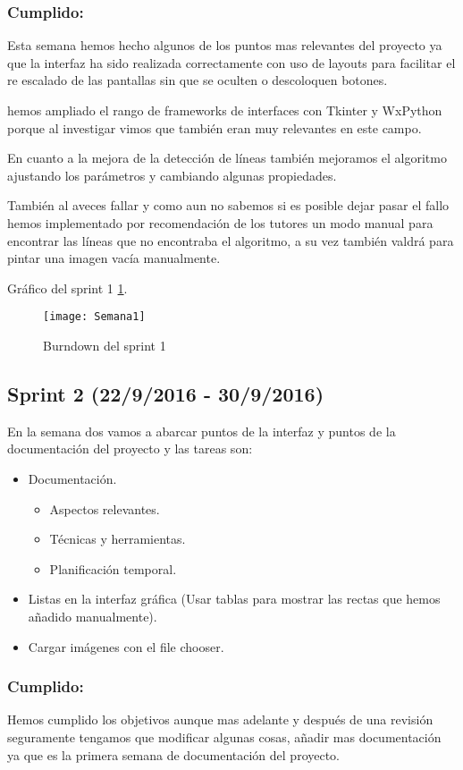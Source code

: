 \subsubsection{Cumplido:}
Esta semana hemos hecho algunos de los puntos mas relevantes del proyecto ya que la interfaz ha sido realizada correctamente con uso de layouts para facilitar el re escalado de las pantallas sin que se oculten o descoloquen botones.

hemos ampliado el rango de frameworks de interfaces con Tkinter y WxPython porque al investigar vimos que también eran muy relevantes en este campo.

En cuanto a la mejora de la detección de líneas también mejoramos el algoritmo ajustando los parámetros y cambiando algunas propiedades.

También al aveces fallar y como aun no sabemos si es posible dejar pasar el fallo hemos implementado por recomendación de los tutores un modo manual para encontrar las líneas que no encontraba el algoritmo, a su vez también valdrá para pintar una imagen vacía manualmente.

Gráfico del sprint 1 \ref{fig:A.2.1}.
\begin{figure}[h]
\centering
\texttt{[image: Semana1]}
\caption{Burndown del sprint 1}
\label{fig:A.2.1}
\end{figure}

\subsection{Sprint 2 (22/9/2016 - 30/9/2016)}
En la semana dos vamos a abarcar puntos de la interfaz y puntos de la documentación del proyecto y las tareas son:
 
\begin{itemize}
\item Documentación. 
\begin{itemize}
	\item Aspectos relevantes. 
	\item Técnicas y herramientas.
	\item Planificación temporal.
	\end{itemize}
\item Listas en la interfaz gráfica (Usar tablas para mostrar las rectas que hemos añadido manualmente).
\item Cargar imágenes con el file chooser.
\end{itemize}

\subsubsection{Cumplido:}
Hemos cumplido los objetivos aunque mas adelante y después de una revisión seguramente tengamos que modificar algunas cosas, añadir mas documentación ya que es la primera semana de documentación del proyecto.

